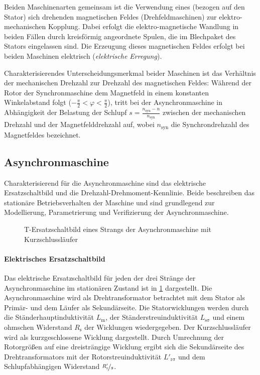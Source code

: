 Beiden Maschinenarten gemeinsam ist die Verwendung eines (bezogen auf den Stator) sich drehenden magnetischen Feldes (Drehfeldmaschinen) zur elektro-mechanischen Kopplung. Dabei erfolgt die elektro-magnetische Wandlung in beiden Fällen durch kreisförmig angeordnete Spulen, die im Blechpaket des Stators eingelassen sind. Die Erzeugung dieses magnetischen Feldes erfolgt bei beiden Maschinen elektrisch (\emph{elektrische Erregung}).

Charakterisierendes Unterscheidungsmerkmal beider Maschinen ist das Verhältnis der mechanischen Drehzahl zur Drehzahl des magnetischen Feldes: Während der Rotor der Synchronmaschine dem Magnetfeld in einem konstanten Winkelabstand folgt (\(-\frac{\pi}{2} < \varphi < \frac{\pi}{2}\)), tritt bei der Asynchronmaschine in Abhängigkeit der Belastung der Schlupf \(s=\frac{n_{\mathrm{syn}} - n}{n_{\mathrm{syn}}}\) zwischen der mechanischen Drehzahl und der Magnetfelddrehzahl auf, wobei \(n_{\mathrm{syn}}\)  die Synchrondrehzahl des Magnetfeldes bezeichnet.

\subsection{Asynchronmaschine}
Charakterisierend für die Asynchronmaschine sind das elektrische Ersatzschaltbild und die Drehzahl-Drehmoment-Kennlinie. Beide beschreiben das stationäre Betriebsverhalten der Maschine und sind grundlegend zur Modellierung, Parametrierung und Verifizierung der Asynchronmaschine.

\begin{figure}
    \centering
    
    \caption{T-Ersatzschaltbild eines Strangs der Asynchronmaschine mit Kurzschlussläufer}
    \label{fig:ESB_ASM}
\end{figure}
\paragraph{Elektrisches Ersatzschaltbild}
Das elektrische Ersatzschaltbild für jeden der drei Stränge der Asynchronmaschine im stationären Zustand ist in \cref{fig:ESB_ASM} dargestellt. Die Asynchronmaschine wird als Drehtransformator betrachtet mit dem Stator als Primär- und dem Läufer als Sekundärseite. Die Statorwicklungen werden durch die Ständerhauptinduktivität $L_{\mathrm{m}}$, der Ständerstreuinduktivität $L_{\mathrm{s\sigma}}$ und einem ohmschen Widerstand $R_{\mathrm{s}}$ der Wicklungen wiedergegeben. Der Kurzschlussläufer wird als kurzgeschlossene Wicklung dargestellt. Durch Umrechnung der Rotorgrößen auf eine dreisträngige Wicklung ergibt sich die Sekundärseite des Drehtransformators mit der Rotorstreuinduktivität $L'_{\mathrm{r\sigma}}$ und dem Schlupfabhängigen Widerstand $\nicefrac{R'_{\mathrm{r}}}{s}$.

